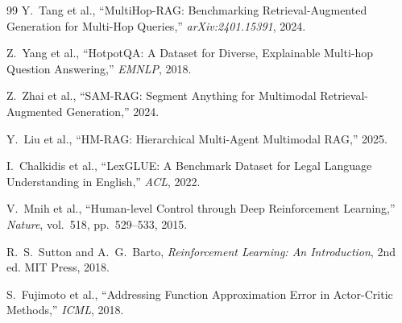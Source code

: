 \documentclass[12pt,a4paper]{article}
\theoremstyle{definition}
\theoremstyle{plain}
\theoremstyle{remark}
\begin{document}
\begin{thebibliography}{99}
Y.\ Tang et al., ``MultiHop-RAG: Benchmarking Retrieval-Augmented Generation for Multi-Hop Queries,'' \textit{arXiv:2401.15391}, 2024.

Z.\ Yang et al., ``HotpotQA: A Dataset for Diverse, Explainable Multi-hop Question Answering,'' \textit{EMNLP}, 2018.

Z.\ Zhai et al., ``SAM-RAG: Segment Anything for Multimodal Retrieval-Augmented Generation,'' 2024.

Y.\ Liu et al., ``HM-RAG: Hierarchical Multi-Agent Multimodal RAG,'' 2025.

I.\ Chalkidis et al., ``LexGLUE: A Benchmark Dataset for Legal Language Understanding in English,'' \textit{ACL}, 2022.


V.\ Mnih et al., ``Human-level Control through Deep Reinforcement Learning,'' \textit{Nature}, vol.~518, pp.~529--533, 2015.

R.\ S.\ Sutton and A.\ G.\ Barto, \textit{Reinforcement Learning: An Introduction}, 2nd ed. MIT Press, 2018.

S.\ Fujimoto et al., ``Addressing Function Approximation Error in Actor-Critic Methods,'' \textit{ICML}, 2018.

\end{thebibliography}
\end{document}
